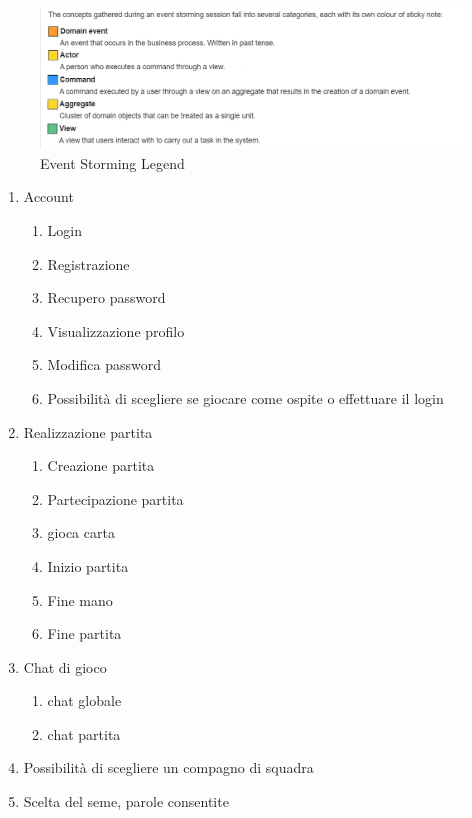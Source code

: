 \begin{figure}[h!]
    \centering 
    \includegraphics[scale=0.60]{report/img/event_storming_legend.png}
    \caption{Event Storming Legend}
    \label{legend}
\end{figure}


\begin{enumerate}
    \item Account
        \begin{enumerate}
            \item Login
            \item Registrazione
            \item Recupero password
            \item Visualizzazione profilo
            \item Modifica password
            \item Possibilità di scegliere se giocare come ospite o effettuare il login
        \end{enumerate}
    \item Realizzazione partita
        \begin{enumerate}
            \item Creazione partita
            \item Partecipazione partita
            \item gioca carta
            \item Inizio partita
            \item Fine mano
            \item Fine partita
        \end{enumerate}
    \item Chat di gioco
        \begin{enumerate}
            \item chat globale
            \item chat partita
        \end{enumerate}
    \item Possibilità di scegliere un compagno di squadra
    \item Scelta del seme, parole consentite

\end{enumerate}

